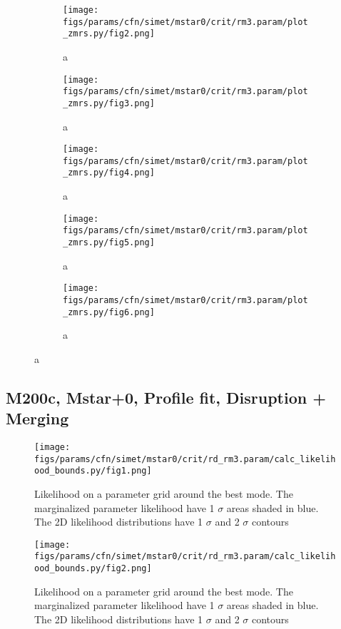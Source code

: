 \documentclass[twocolumn]{article}
\begin{document}
\begin{figure}
  \begin{subfigure}{.5\textwidth}
    \centering\texttt{[image: figs/params/cfn/simet/mstar0/crit/rm3.param/plot\_zmrs.py/fig2.png]}
    \caption{a}
  \end{subfigure}
  \begin{subfigure}{.5\textwidth}
    \centering\texttt{[image: figs/params/cfn/simet/mstar0/crit/rm3.param/plot\_zmrs.py/fig3.png]}
    \caption{a}
  \end{subfigure}
  \begin{subfigure}{.5\textwidth}
    \centering\texttt{[image: figs/params/cfn/simet/mstar0/crit/rm3.param/plot\_zmrs.py/fig4.png]}
    \caption{a}
  \end{subfigure}%
  \begin{subfigure}{.5\textwidth}
    \centering\texttt{[image: figs/params/cfn/simet/mstar0/crit/rm3.param/plot\_zmrs.py/fig5.png]}
    \caption{a}
  \end{subfigure}
  \begin{subfigure}{.5\textwidth}
    \centering\texttt{[image: figs/params/cfn/simet/mstar0/crit/rm3.param/plot\_zmrs.py/fig6.png]}
    \caption{a}
  \end{subfigure}
\end{figure}
\clearpage


\subsection{M200c, Mstar+0, Profile fit, Disruption + Merging}
\begin{figure}[H]
  \center\texttt{[image: figs/params/cfn/simet/mstar0/crit/rd\_rm3.param/calc\_likelihood\_bounds.py/fig1.png]}
  \caption{Likelihood on a parameter grid around the best mode. The marginalized parameter likelihood have
    1 $\sigma$ areas shaded in blue. The 2D likelihood distributions have 1 $\sigma$  and 2 $\sigma$ contours}
  \label{fig:basic_rd:likelihood}
\end{figure}

\begin{figure}[H]
  \center\texttt{[image: figs/params/cfn/simet/mstar0/crit/rd\_rm3.param/calc\_likelihood\_bounds.py/fig2.png]}
  \caption{Likelihood on a parameter grid around the best mode. The marginalized parameter likelihood have
    1 $\sigma$ areas shaded in blue. The 2D likelihood distributions have 1 $\sigma$  and 2 $\sigma$ contours}
  \label{fig:basic_rd:likelihood}
\end{figure}
\end{document}
